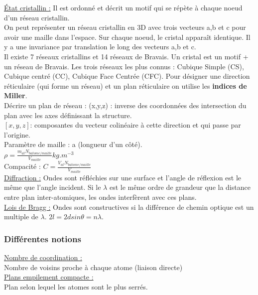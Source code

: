 \documentclass[../main.tex]{subfiles}
\begin{document}
\quad \underline{État cristallin :}
Il est ordonné et décrit un motif qui se répète à chaque noeud d'un réseau cristallin.\\
On peut représenter un réseau cristallin en 3D avec trois vecteurs a,b et c pour avoir une maille dans l'espace. Sur chaque noeud, le cristal apparaît identique. Il y a une invariance par translation le long des vecteurs a,b et c.\\
Il existe 7 réseaux cristallins et 14 réseaux de Bravais. Un cristal est un motif + un réseau de Bravais. Les trois réseaux les plus connus : Cubique Simple (CS), Cubique centré (CC), Cubique Face Centrée (CFC). Pour désigner une direction réticulaire (qui forme un réseau) et un plan réticulaire on utilise les \textbf{indices de Miller}. \\

Décrire un plan de réseau : (x,y,z) : inverse des coordonnées des intersection du plan avec les axes définissant la structure. \\
$[x,y,z] $: composantes du vecteur colinéaire à cette direction et qui passe par l'origine.\\

Paramètre de maille : a (longueur d'un côté).\\
$\rho = \frac{m_{at} N_{b atome/maille}}{V_{maille}} kg.m^{-3}$\\
Compacité : $C = \frac{V_{at} N_{b atome/maille}}{V_{maille}}$\\

\quad \underline{Diffraction :}
Ondes sont réfléchies sur une surface et l'angle de réflexion est le même que l'angle incident. Si le $\lambda$ est le même ordre de grandeur que la distance entre plan inter-atomiques, les ondes interfèrent avec ces plans.\\

\underline{Lois de Bragg :} Ondes sont constructives si la différence de chemin optique est un multiple de $\lambda$. $2l = 2d sin\theta = n\lambda$.\\

\subsubsection{Différentes notions}
\quad \underline{Nombre de coordination :}\\
Nombre de voisins proche à chaque atome (liaison directe)\\

\quad \underline{Plans empilement compacte :}\\
Plan selon lequel les atomes sont le plus serrés.\\
\end{document}
